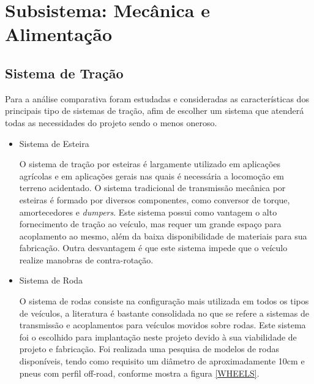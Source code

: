 \section{Subsistema: Mecânica e Alimentação}

  \subsection{Sistema de Tração}

  Para a análise comparativa foram estudadas e consideradas as características dos principais tipo de sistemas de tração,
  afim de escolher um sistema que atenderá todas as necessidades do projeto sendo o menos oneroso.

  \begin{itemize}
    \item Sistema de Esteira

    O sistema de tração por esteiras é largamente utilizado em aplicações agrícolas e em aplicações gerais nas quais é necessária
    a locomoção em terreno acidentado. O sistema tradicional de transmissão mecânica por esteiras é formado por diversos componentes,
    como conversor de torque, amortecedores e \textit{dumpers}.
    Este sistema possui como vantagem o alto fornecimento de tração ao veículo, mas requer um grande espaço para acoplamento ao mesmo,
    além da baixa disponibilidade de materiais para sua fabricação. Outra desvantagem é que este sistema impede que o veículo realize
    manobras de contra-rotação.

    \item Sistema de Roda

    O sistema de rodas consiste na configuração mais utilizada em todos os tipos de veículos, a literatura é bastante consolidada
    no que se refere a sistemas de transmissão e acoplamentos para veículos movidos sobre rodas. Este sistema foi o escolhido para
    implantação neste projeto devido à sua viabilidade de projeto e fabricação.
    Foi realizada uma pesquisa de modelos de rodas disponíveis, tendo como requisito um diâmetro de aproximadamente 10cm e pneus com
    perfil off-road, conforme mostra a figura \ref{WHEELS}.


\end{itemize}
